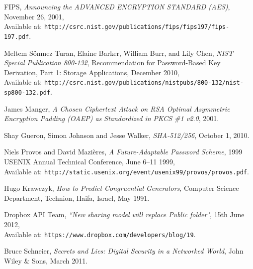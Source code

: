 \documentclass[12pt, titlepage]{article}
\begin{document}
\begin{thebibliography}{10}
FIPS, \emph{Announcing the ADVANCED ENCRYPTION STANDARD (AES)}, November 26, 2001,
\\ Available at:
\texttt{http://csrc.nist.gov/publications/fips/fips197/fips-197.pdf}.

Meltem Sönmez Turan, Elaine Barker, William Burr, and Lily Chen, \emph{NIST Special Publication 800-132}, Recommendation for Password-Based Key Derivation, Part 1: Storage Applications, December 2010,
\\ Available at: \texttt{http://csrc.nist.gov/publications/nistpubs/800-132/nist-sp800-132.pdf}.

James Manger, \emph{A Chosen Ciphertext Attack on RSA Optimal Asymmetric Encryption Padding (OAEP) as Standardized in PKCS \#1 v2.0}, 2001.

Shay Gueron, Simon Johnson and Jesse Walker, \emph{SHA-512/256}, October 1, 2010.

Niels Provos and David Mazières, \emph{A Future-Adaptable Password Scheme}, 1999 USENIX Annual Technical Conference, June 6–11 1999,
\\ Available at: \texttt{http://static.usenix.org/event/usenix99/provos/provos.pdf}. 

Hugo Krawczyk, \emph{How to Predict Congruential Generators}, Computer Science Department, Technion, Haifa, Israel, May 1991. 

Dropbox API Team, \emph{``New sharing model will replace Public folder"},  15th June 2012,
\\ Available at: \texttt{https://www.dropbox.com/developers/blog/19}.

Bruce Schneier, \emph{Secrets and Lies: Digital Security in a Networked World},  John Wiley \& Sons, March 2011.

\end{thebibliography}
\end{document}
